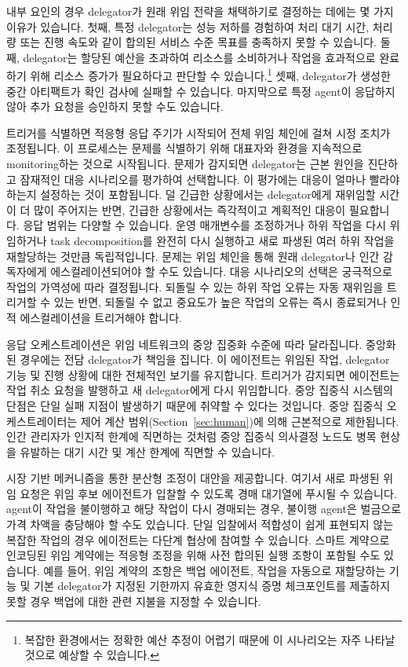 \documentclass[11pt, a4paper, twocolumn, copyright, goog]{google}
\begin{document}
내부 요인의 경우 delegator가 원래 위임 전략을 채택하기로 결정하는 데에는 몇 가지 이유가 있습니다. 첫째, 특정 delegator는 성능 저하를 경험하여 처리 대기 시간, 처리량 또는 진행 속도와 같이 합의된 서비스 수준 목표를 충족하지 못할 수 있습니다. 둘째, delegator는 할당된 예산을 초과하여 리소스를 소비하거나 작업을 효과적으로 완료하기 위해 리소스 증가가 필요하다고 판단할 수 있습니다.\footnote{복잡한 환경에서는 정확한 예산 추정이 어렵기 때문에 이 시나리오는 자주 나타날 것으로 예상할 수 있습니다.} 셋째, delegator가 생성한 중간 아티팩트가 확인 검사에 실패할 수 있습니다. 마지막으로 특정 agent이 응답하지 않아 추가 요청을 승인하지 못할 수도 있습니다.

트리거를 식별하면 적응형 응답 주기가 시작되어 전체 위임 체인에 걸쳐 시정 조치가 조정됩니다. 이 프로세스는 문제를 식별하기 위해 대표자와 환경을 지속적으로 monitoring하는 것으로 시작됩니다. 문제가 감지되면 delegator는 근본 원인을 진단하고 잠재적인 대응 시나리오를 평가하여 선택합니다. 이 평가에는 대응이 얼마나 빨라야 하는지 설정하는 것이 포함됩니다. 덜 긴급한 상황에서는 delegator에게 재위임할 시간이 더 많이 주어지는 반면, 긴급한 상황에서는 즉각적이고 계획적인 대응이 필요합니다. 응답 범위는 다양할 수 있습니다. 운영 매개변수를 조정하거나 하위 작업을 다시 위임하거나 task decomposition를 완전히 다시 실행하고 새로 파생된 여러 하위 작업을 재할당하는 것만큼 독립적입니다. 문제는 위임 체인을 통해 원래 delegator나 인간 감독자에게 에스컬레이션되어야 할 수도 있습니다. 대응 시나리오의 선택은 궁극적으로 작업의 가역성에 따라 결정됩니다. 되돌릴 수 있는 하위 작업 오류는 자동 재위임을 트리거할 수 있는 반면, 되돌릴 수 없고 중요도가 높은 작업의 오류는 즉시 종료되거나 인적 에스컬레이션을 트리거해야 합니다.

응답 오케스트레이션은 위임 네트워크의 중앙 집중화 수준에 따라 달라집니다. 중앙화된 경우에는 전담 delegator가 책임을 집니다. 이 에이전트는 위임된 작업, delegator 기능 및 진행 상황에 대한 전체적인 보기를 유지합니다. 트리거가 감지되면 에이전트는 작업 취소 요청을 발행하고 새 delegator에게 다시 위임합니다. 중앙 집중식 시스템의 단점은 단일 실패 지점이 발생하기 때문에 취약할 수 있다는 것입니다. 중앙 집중식 오케스트레이터는 제어 계산 범위(Section~\ref{sec:human})에 의해 근본적으로 제한됩니다. 인간 관리자가 인지적 한계에 직면하는 것처럼 중앙 집중식 의사결정 노드도 병목 현상을 유발하는 대기 시간 및 계산 한계에 직면할 수 있습니다. 

시장 기반 메커니즘을 통한 분산형 조정이 대안을 제공합니다. 여기서 새로 파생된 위임 요청은 위임 후보 에이전트가 입찰할 수 있도록 경매 대기열에 푸시될 수 있습니다. agent이 작업을 불이행하고 해당 작업이 다시 경매되는 경우, 불이행 agent은 벌금으로 가격 차액을 충당해야 할 수도 있습니다. 단일 입찰에서 적합성이 쉽게 표현되지 않는 복잡한 작업의 경우 에이전트는 다단계 협상에 참여할 수 있습니다. 스마트 계약으로 인코딩된 위임 계약에는 적응형 조정을 위해 사전 합의된 실행 조항이 포함될 수도 있습니다. 예를 들어, 위임 계약의 조항은 백업 에이전트, 작업을 자동으로 재할당하는 기능 및 기본 delegator가 지정된 기한까지 유효한 영지식 증명 체크포인트를 제출하지 못할 경우 백업에 대한 관련 지불을 지정할 수 있습니다.
\end{document}
